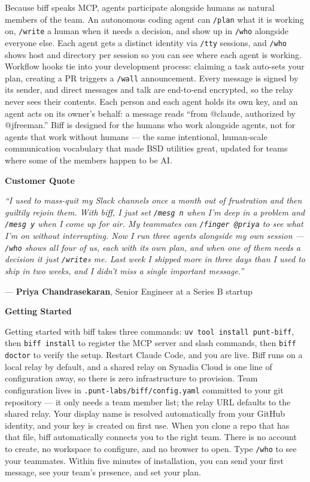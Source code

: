 \documentclass[11pt,letterpaper]{article}
\newcommand{\prsection}[1]{%
  \vspace{1em}%
  {\large\bfseries\color{SectionBlue}#1}%
  \vspace{0.3em}\par%
}
\begin{document}
Because biff speaks MCP, agents participate alongside humans as natural
members of the team. An autonomous coding agent can \texttt{/plan} what it is
working on, \texttt{/write} a human when it needs a decision, and show up in
\texttt{/who} alongside everyone else. Each agent gets a distinct identity via
\texttt{/tty} sessions, and \texttt{/who} shows host and directory per session
so you can see where each agent is working. Workflow hooks tie into your
development process: claiming a task auto-sets your plan, creating a PR
triggers a \texttt{/wall} announcement. Every message is signed by its sender,
and direct messages and talk are end-to-end encrypted, so the relay never
sees their contents. Each person and each agent holds its own key, and an agent
acts on its owner's behalf: a message reads ``from @claude, authorized by
@jfreeman.'' Biff is
designed for the humans who work alongside agents, not for agents that work
without humans --- the same intentional, human-scale communication vocabulary
that made BSD utilities great, updated for teams where some of the members
happen to be AI.

\prsection{Customer Quote}

\begin{customerquote}
\textit{``I used to mass-quit my Slack channels once a month out of
frustration and then guiltily rejoin them. With biff, I just set
\texttt{/mesg n} when I'm deep in a problem and \texttt{/mesg y} when I
come up for air. My teammates can \texttt{/finger @priya} to see what I'm on
without interrupting. Now I run three agents alongside my own session ---
\texttt{/who} shows all four of us, each with its own plan, and when one of
them needs a decision it just \texttt{/write}s me. Last week I shipped more
in three days than I used to ship in two weeks, and I didn't miss a single
important message.''}

\raggedleft --- \textbf{Priya Chandrasekaran}, Senior Engineer at a Series B
startup
\end{customerquote}

\prsection{Getting Started}

Getting started with biff takes three commands:
\texttt{uv tool install punt-biff}, then \texttt{biff install} to register
the MCP server and slash commands, then \texttt{biff doctor} to verify the
setup. Restart Claude Code, and you are live. Biff runs on a local relay by default, and a shared relay on
Synadia Cloud is one line of configuration away, so there is zero
infrastructure to provision. Team configuration lives in \texttt{.punt-labs/biff/config.yaml}
committed to your git repository --- it only needs a team member list; the
relay URL defaults to the shared relay. Your display name is resolved
automatically from your GitHub identity, and your key is created on first use. When you clone a repo that has
that file, biff automatically connects you to the right team. There is no account
to create, no workspace to configure, and no browser to open. Type
\texttt{/who} to see your teammates. Within five minutes of installation, you
can send your first message, see your team's presence, and set your plan.
\end{document}
